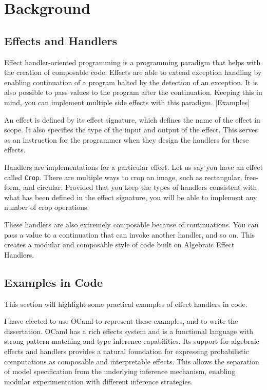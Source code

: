 \documentclass[logo,bsc,singlespacing,parskip,online]{infthesis}
\begin{document}
\chapter{Background}

\section{Effects and Handlers}

Effect handler-oriented programming is a programming paradigm that helps with the creation of composable code. Effects are able to extend exception handling by enabling continuation of a program halted by the detection of an exception. It is also possible to pass values to the program after the continuation. Keeping this in mind, you can implement multiple side effects with this paradigm. [Examples]

An effect is defined by its effect signature, which defines the name of the effect in scope. It also specifies the type of the input and output of the effect. This serves as an instruction for the programmer when they design the handlers for these effects. 

Handlers are implementations for a particular effect. Let us say you have an effect called \texttt{Crop}. There are multiple ways to crop an image, such as rectangular, free-form, and circular. Provided that you keep the types of handlers consistent with what has been defined in the effect signature, you will be able to implement any number of crop operations.

These handlers are also extremely composable because of continuations. You can pass a value to a continuation that can invoke another handler, and so on. This creates a modular and composable style of code built on Algebraic Effect Handlers. 

\section{Examples in Code}

This section will highlight some practical examples of effect handlers in code. 

I have elected to use OCaml to represent these examples, and to write the dissertation. OCaml has a rich effects system and is a functional language with strong pattern matching and type inference capabilities. Its support for algebraic effects and handlers provides a natural foundation for expressing probabilistic computations as composable and interpretable effects. This allows the separation of model specification from the underlying inference mechanism, enabling modular experimentation with different inference strategies. 
\end{document}
